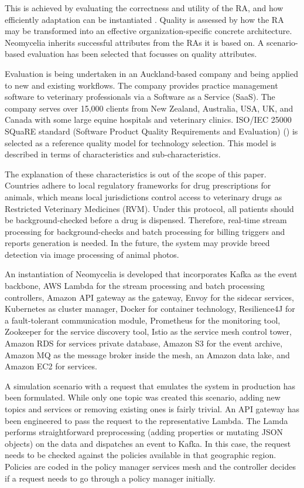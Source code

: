\documentclass[runningheads]{llncs}
\begin{document}
This is achieved by evaluating the correctness and utility of the RA, and how efficiently adaptation can be instantiated \cite{GALSTER}. Quality is assessed by how the RA may be transformed into an effective organization-specific concrete architecture. Neomycelia inherits successful attributes from the RAs it is based on. A scenario-based evaluation has been selected that focusses on quality attributes.

Evaluation is being undertaken in an Auckland-based company and being applied to new and existing workflows. The company provides practice management software to veterinary professionals via a Software as a Service (SaaS). The company serves over 15,000 clients from New Zealand, Australia, USA, UK, and Canada with some large equine hospitals and veterinary clinics. ISO/IEC 25000 SQuaRE standard (Software Product Quality Requirements and Evaluation) (\cite{Iso}) is selected as a reference quality model for technology selection. This model is described in terms of characteristics and sub-characteristics.

The explanation of these characteristics is out of the scope of this paper.
Countries adhere to local regulatory frameworks for drug prescriptions for animals, which means local jurisdictions control access to veterinary drugs as Restricted Veterinary Medicines (RVM). Under this protocol, all patients should be background-checked before a drug is dispensed. Therefore, real-time stream processing for background-checks and batch processing for billing triggers and reports generation is needed.  In the future, the system may provide breed detection via image processing of animal photos.

An instantiation of Neomycelia is developed that incorporates Kafka as the event backbone, AWS Lambda for the stream processing and batch processing controllers, Amazon API gateway as the gateway, Envoy for the sidecar services, Kubernetes as cluster manager, Docker for container technology, Resilience4J for a fault-tolerant communication module, Prometheus for the monitoring tool, Zookeeper for the service discovery tool, Istio as the service mesh control tower, Amazon RDS for services private database, Amazon S3 for the event archive, Amazon MQ as the message broker inside the mesh, an Amazon data lake, and Amazon EC2 for services.

A simulation scenario with a request that emulates the system in production has been formulated. While only one topic was created this scenario, adding new topics and services or removing existing ones is fairly trivial. An API gateway has been engineered to pass the request to the representative Lambda. The Lamda performs straightforward preprocessing (adding properties or mutating JSON objects) on the data and dispatches an event to Kafka. In this case, the request needs to be checked against the policies available in that geographic region. Policies are coded in the policy manager services mesh and the controller decides if a request needs to go through a policy manager initially.
\end{document}

